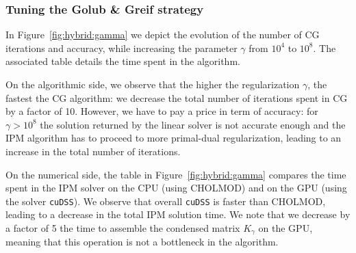 \subsubsection{Tuning the Golub \& Greif strategy}
In Figure~\ref{fig:hybrid:gamma} we depict the evolution of the number
of CG iterations and accuracy, while increasing the parameter $\gamma$
from $10^4$ to $10^8$. The associated table details the time spent
in the algorithm.

On the algorithmic side, we observe that the higher the regularization $\gamma$,
the fastest the CG algorithm: we decrease the total number of iterations
spent in CG by a factor of 10. However, we have to pay a price in term
of accuracy: for $\gamma > 10^8$ the solution returned by the linear solver
is not accurate enough and the IPM algorithm has to proceed to more
primal-dual regularization, leading to an increase in the total number of iterations.

On the numerical side, the table in Figure~\ref{fig:hybrid:gamma} compares
the time spent in the IPM solver on the CPU (using CHOLMOD) and on the GPU
(using the solver {\tt cuDSS}). We observe that overall {\tt cuDSS} is
faster than CHOLMOD, leading to a decrease in the total IPM solution time.
We note that we decrease by a factor of 5 the time to assemble the condensed
matrix $K_\gamma$ on the GPU, meaning that this operation is not a bottleneck in
the algorithm.

